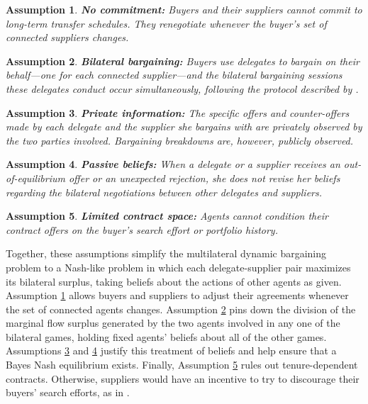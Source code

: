 \documentclass[12pt]{article} \usepackage{amsmath,amssymb,amsthm,geometry,graphicx,setspace,algorithm,algpseudocode,float}
\newtheorem{assumption}{Assumption}
\begin{document}
\begin{assumption}
\label{ass_bargain_1}
\textbf{No commitment:} Buyers and their suppliers cannot commit to long-term transfer schedules. They renegotiate whenever the buyer's set of connected suppliers changes. 
\end{assumption}
\begin{assumption}
\textbf{Bilateral bargaining:} Buyers use delegates to bargain on their behalf---one for each connected supplier---and the bilateral bargaining sessions these delegates conduct occur simultaneously, following the protocol described by \citet{Binmore_etal1986}. 
\label{ass_bargain_2}
\end{assumption}
\begin{assumption}
\textbf{Private information:} The specific offers and counter-offers made by each delegate and the supplier she bargains with are privately observed by the two parties involved. Bargaining breakdowns are, however, publicly observed.
\label{ass_bargain_3}
\end{assumption}
\begin{assumption}
\textbf{Passive beliefs: }When a delegate or a supplier receives an out-of-equilibrium offer or an unexpected rejection, she does not revise her beliefs regarding the bilateral negotiations between other delegates and suppliers.
\label{ass_bargain_4}
\end{assumption}
\begin{assumption}
\textbf{Limited contract space:} Agents cannot condition their contract offers on the buyer's search effort or portfolio history.
\label{ass_bargain_5}
\end{assumption}
\par
Together, these assumptions simplify the multilateral dynamic bargaining problem to a Nash-like problem in which each delegate-supplier pair maximizes its bilateral surplus, taking beliefs about the actions of other agents as given. Assumption \ref{ass_bargain_1} allows buyers and suppliers to adjust their agreements whenever the set of connected agents changes. Assumption \ref{ass_bargain_2} pins down the division of the marginal flow surplus generated by the two agents involved in any one of the bilateral games, holding fixed agents' beliefs about all of the other games. Assumptions \ref{ass_bargain_3} and \ref{ass_bargain_4} justify this treatment of beliefs and help ensure that a Bayes Nash equilibrium exists. Finally, Assumption \ref{ass_bargain_5} rules out tenure-dependent contracts. Otherwise, suppliers would have an incentive to try to discourage their buyers' search efforts, as in \citet{Lentz2014}.
\end{document}

